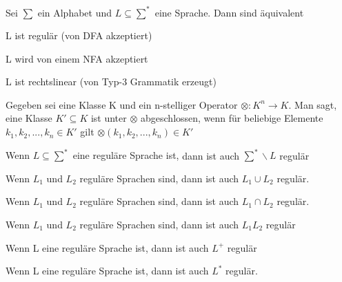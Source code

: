 \documentclass[avery5371, frame]{flashcards}
\begin{document}
\begin{flashcard}[Satz]{ Sei $\sum$ ein Alphabet und $L\subseteq \sum^*$ eine Sprache. Dann sind äquivalent}
    \begin{itemize*}
        \item L ist regulär (von DFA akzeptiert)
        \item L wird von einem NFA akzeptiert
        \item L ist rechtslinear (von Typ-3 Grammatik erzeugt)
    \end{itemize*}
\end{flashcard}

\begin{flashcard}[Definition]{ Gegeben sei eine Klasse K und ein n-stelliger Operator $\otimes : K^n \rightarrow K$.}
    Man sagt, eine Klasse $K'\subseteq K$ ist unter $\otimes$ abgeschlossen, wenn für beliebige Elemente $k_1,k_2,...,k_n\in K'$ gilt $\otimes (k_1,k_2,...,k_n)\in K'$
\end{flashcard}

\begin{flashcard}[Satz]{ Wenn $L\subseteq \sum^*$ eine reguläre Sprache ist,}
    dann ist auch $\sum^* \backslash L$ regulär
\end{flashcard}

\begin{flashcard}[Satz]{ Wenn $L_1$ und $L_2$ reguläre Sprachen sind,}
    dann ist auch $L_1 \cup L_2$ regulär.
\end{flashcard}

\begin{flashcard}[Satz]{ Wenn $L_1$ und $L_2$ reguläre Sprachen sind,}
    dann ist auch $L_1 \cap L_2$ regulär.
\end{flashcard}

\begin{flashcard}[Satz]{ Wenn $L_1$ und $L_2$ reguläre Sprachen sind,}
    dann ist auch $L_1L_2$ regulär
\end{flashcard}

\begin{flashcard}[Satz]{ Wenn L eine reguläre Sprache ist,}
    dann ist auch $L^+$ regulär
\end{flashcard}

\begin{flashcard}[Satz]{ Wenn L eine reguläre Sprache ist,}
    dann ist auch $L^*$ regulär.
\end{flashcard}
\end{document}
